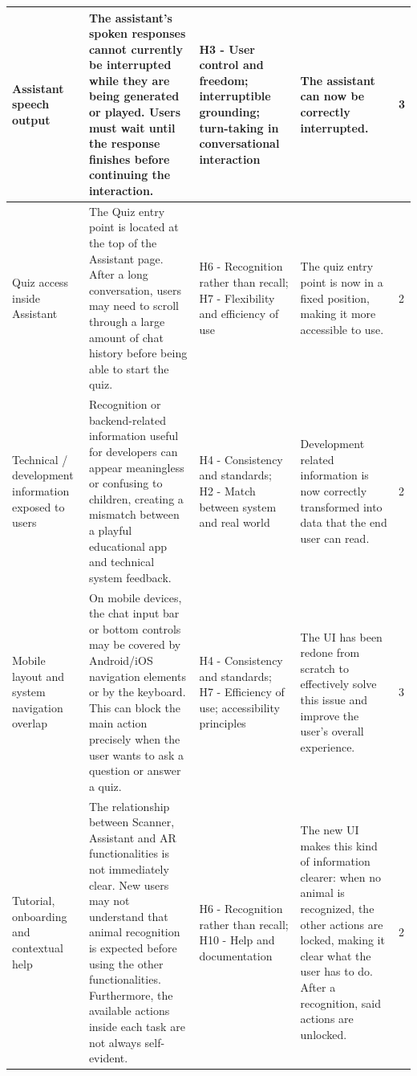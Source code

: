 \documentclass{article}
\begin{document}
\begin{longtable}{L{0.10\textwidth} L{0.28\textwidth} L{0.20\textwidth} L{0.23\textwidth} C{0.05\textwidth}}
Assistant speech output & The assistant's spoken responses cannot currently be interrupted while they are being generated or played. Users must wait until the response finishes before continuing the interaction. & H3 - User control and freedom; interruptible grounding; turn-taking in conversational interaction & The assistant can now be correctly interrupted. & 3 \\
\midrule

Quiz access inside Assistant & The Quiz entry point is located at the top of the Assistant page. After a long conversation, users may need to scroll through a large amount of chat history before being able to start the quiz. & H6 - Recognition rather than recall; H7 - Flexibility and efficiency of use & The quiz entry point is now in a fixed position, making it more accessible to use. & 2 \\
\midrule

Technical / development information exposed to users & Recognition or backend-related information useful for developers can appear meaningless or confusing to children, creating a mismatch between a playful educational app and technical system feedback. & H4 - Consistency and standards; H2 - Match between system and real world & Development related information is now correctly transformed into data that the end user can read. & 2 \\
\midrule

Mobile layout and system navigation overlap & On mobile devices, the chat input bar or bottom controls may be covered by Android/iOS navigation elements or by the keyboard. This can block the main action precisely when the user wants to ask a question or answer a quiz. & H4 - Consistency and standards; H7 - Efficiency of use; accessibility principles & The UI has been redone from scratch to effectively solve this issue and improve the user's overall experience. & 3 \\
\midrule

Tutorial, onboarding and contextual help & The relationship between Scanner, Assistant and AR functionalities is not immediately clear. New users may not understand that animal recognition is expected before using the other functionalities. Furthermore, the available actions inside each task are not always self-evident. & H6 - Recognition rather than recall; H10 - Help and documentation & The new UI makes this kind of information clearer: when no animal is recognized, the other actions are locked, making it clear what the user has to do. After a recognition, said actions are unlocked. & 2 \\
\midrule


\end{longtable}
\end{document}
